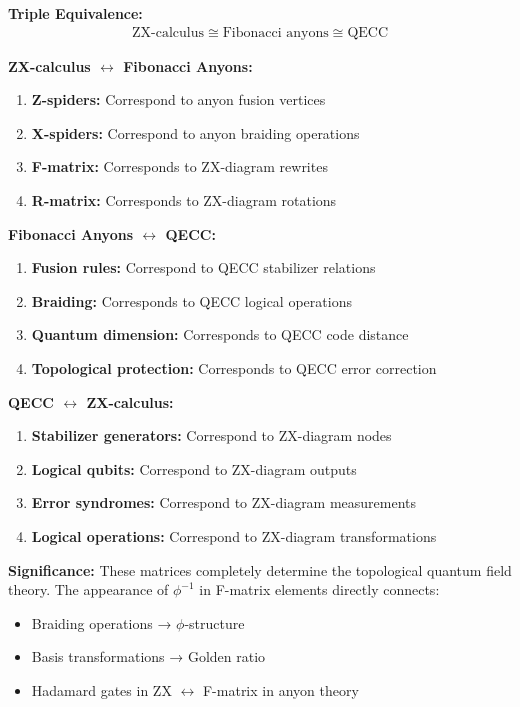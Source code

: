 \documentclass[11pt]{article}
\theoremstyle{definition}
\newcommand{\goldenratio}{\phi}
\begin{document}
\textbf{Triple Equivalence:}
\begin{align}
\text{ZX-calculus} \cong \text{Fibonacci anyons} \cong \text{QECC}
\end{align}

\textbf{ZX-calculus $\leftrightarrow$ Fibonacci Anyons:}
\begin{enumerate}
\item \textbf{Z-spiders:} Correspond to anyon fusion vertices
\item \textbf{X-spiders:} Correspond to anyon braiding operations
\item \textbf{F-matrix:} Corresponds to ZX-diagram rewrites
\item \textbf{R-matrix:} Corresponds to ZX-diagram rotations
\end{enumerate}

\textbf{Fibonacci Anyons $\leftrightarrow$ QECC:}
\begin{enumerate}
\item \textbf{Fusion rules:} Correspond to QECC stabilizer relations
\item \textbf{Braiding:} Corresponds to QECC logical operations
\item \textbf{Quantum dimension:} Corresponds to QECC code distance
\item \textbf{Topological protection:} Corresponds to QECC error correction
\end{enumerate}

\textbf{QECC $\leftrightarrow$ ZX-calculus:}
\begin{enumerate}
\item \textbf{Stabilizer generators:} Correspond to ZX-diagram nodes
\item \textbf{Logical qubits:} Correspond to ZX-diagram outputs
\item \textbf{Error syndromes:} Correspond to ZX-diagram measurements
\item \textbf{Logical operations:} Correspond to ZX-diagram transformations
\end{enumerate}

\textbf{Significance:} These matrices completely determine the topological quantum field theory. The appearance of $\goldenratio^{-1}$ in F-matrix elements directly connects:
\begin{itemize}
\item Braiding operations → $\goldenratio$-structure
\item Basis transformations → Golden ratio
\item Hadamard gates in ZX $\leftrightarrow$ F-matrix in anyon theory
\end{itemize}
\end{document}
